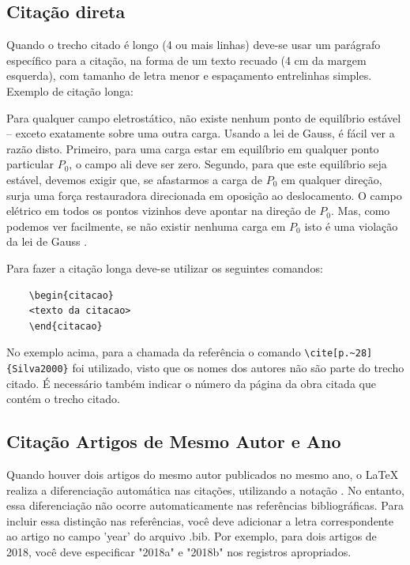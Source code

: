 \subsection{Citação direta}
\label{subsec:citacaoDireta}

Quando o trecho citado é longo (4 ou mais linhas) deve-se usar um parágrafo específico para a citação, na forma de um texto recuado (4 cm da margem esquerda), com tamanho de letra menor e espaçamento entrelinhas simples. Exemplo de citação longa:
\\
\begin{citacao}
    Para qualquer campo eletrostático, não existe nenhum ponto de equilíbrio estável – exceto exatamente sobre uma outra carga. Usando a lei de Gauss, é fácil ver a razão disto. Primeiro, para uma carga estar em equilíbrio em qualquer ponto particular $P_0$, o campo ali deve ser zero. Segundo, para que este equilíbrio seja estável, devemos exigir que, se afastarmos a carga de $P_0$ em qualquer direção, surja uma força restauradora direcionada em oposição ao deslocamento. O campo elétrico em todos os pontos vizinhos deve apontar na direção de $P_0$. Mas, como podemos ver facilmente, se não existir nenhuma carga em $P_0$ isto é uma violação da lei de Gauss \cite[p.~51]{feynman}.

\end{citacao}
\noindent
Para fazer a citação longa deve-se utilizar os seguintes comandos:
\begin{verbatim}
    \begin{citacao}
    <texto da citacao>
    \end{citacao}
\end{verbatim}

No exemplo acima, para a chamada da referência o comando \verb|\cite[p.~28]{Silva2000}| foi utilizado, visto que os nomes dos autores não são parte do trecho citado. É necessário também indicar o número da página da obra citada que contém o trecho citado.

\subsection{Citação Artigos de Mesmo Autor e Ano}
Quando houver dois artigos do mesmo autor publicados no mesmo ano, o LaTeX realiza a diferenciação automática nas citações, utilizando a notação \cite{lewis2018a, lewis2018b}. No entanto, essa diferenciação não ocorre automaticamente nas referências bibliográficas. Para incluir essa distinção nas referências, você deve adicionar a letra correspondente ao artigo no campo 'year' do arquivo .bib. Por exemplo, para dois artigos de 2018, você deve especificar "2018a" e "2018b" nos registros apropriados.


